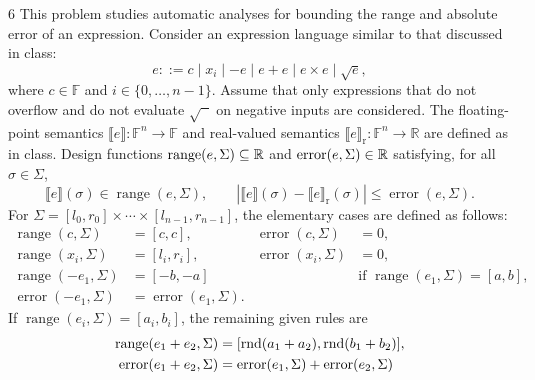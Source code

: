 \documentclass[11pt,oneside]{article}
\begin{document}

\begin{problem}{6}
This problem studies automatic analyses for bounding the range and
absolute error of an expression. Consider an expression language similar
to that discussed in class:
\[
 e::=c\mid x_i\mid-e\mid e+e\mid e\times e\mid\sqrt e,
\]
where $c\in\mathbb F$ and $i\in\{0, \ldots, n-1\}$.
Assume that only expressions that do not overflow and do not evaluate
$\sqrt{\phantom{x}}$ on negative inputs are considered. The floating-point
semantics $\llbracket e\rrbracket\colon\mathbb F^n\to\mathbb F$
and real-valued semantics
$\llbracket e\rrbracket_{\mathrm r}\colon\mathbb F^n\to\mathbb R$
are defined as in class. Design functions
$\operatorname{range}(e, \Sigma)\subseteq\mathbb{R}$ and
$\operatorname{error}(e, \Sigma)\in\mathbb{R}$ satisfying, for all
$\sigma\in\Sigma$,
\[
 \llbracket e\rrbracket(\sigma)\in\operatorname{range}(e, \Sigma),
 \qquad
 |\llbracket e\rrbracket(\sigma)
   -\llbracket e\rrbracket_{\mathrm r}(\sigma)|
 \le\operatorname{error}(e, \Sigma).
\]
For $\Sigma=[l_0, r_0]\times\cdots\times[l_{n-1}, r_{n-1}]$,
the elementary cases are defined as follows:
\[
\begin{aligned}
 \operatorname{range}(c, \Sigma)&=[c, c], &
 \operatorname{error}(c, \Sigma)&=0, \\
 \operatorname{range}(x_i, \Sigma)&=[l_i, r_i], &
 \operatorname{error}(x_i, \Sigma)&=0, \\
 \operatorname{range}(-e_1, \Sigma)&=[-b, -a]
   &&\text{if }\operatorname{range}(e_1, \Sigma)=[a, b], \\
 \operatorname{error}(-e_1, \Sigma)&=\operatorname{error}(e_1, \Sigma).
\end{aligned}
\]
If $\operatorname{range}(e_i, \Sigma)=[a_i, b_i]$, the remaining
given rules are
\[
\begin{aligned}
 \operatorname{range}(e_1+e_2, \Sigma)
  &=[\rnd(a_1+a_2), \rnd(b_1+b_2)], \\
 \operatorname{error}(e_1+e_2, \Sigma)
  &=\operatorname{error}(e_1, \Sigma)
   +\operatorname{error}(e_2, \Sigma)\\

\end{aligned}\]
\end{problem}
\end{document}
